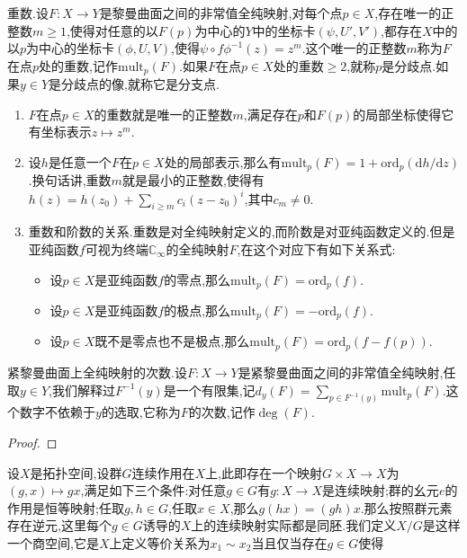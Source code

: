 重数.设$F:X\to Y$是黎曼曲面之间的非常值全纯映射,对每个点$p\in X$,存在唯一的正整数$m\ge1$,使得对任意的以$F(p)$为中心的$Y$中的坐标卡$(\psi,U',V')$,都存在$X$中的以$p$为中心的坐标卡$(\phi,U,V)$,使得$\psi\circ f\phi^{-1}(z)=z^m$.这个唯一的正整数$m$称为$F$在点$p$处的重数,记作$\mathrm{mult}_p(F)$.如果$F$在点$p\in X$处的重数$\ge2$,就称$p$是分歧点.如果$y\in Y$是分歧点的像,就称它是分支点.
\begin{enumerate}
	\item $F$在点$p\in X$的重数就是唯一的正整数$m$,满足存在$p$和$F(p)$的局部坐标使得它有坐标表示$z\mapsto z^m$.
	\item 设$h$是任意一个$F$在$p\in X$处的局部表示,那么有$\mathrm{mult}_p(F)=1+\mathrm{ord}_p(\mathrm{d}h/\mathrm{d}z)$.换句话讲,重数$m$就是最小的正整数,使得有$h(z)=h(z_0)+\sum_{i\ge m}c_i(z-z_0)^i$,其中$c_m\not=0$.
	\item 重数和阶数的关系.重数是对全纯映射定义的,而阶数是对亚纯函数定义的.但是亚纯函数$f$可视为终端$\mathbb{C}_{\infty}$的全纯映射$F$,在这个对应下有如下关系式:
	\begin{itemize}
		\item 设$p\in X$是亚纯函数$f$的零点,那么$\mathrm{mult}_p(F)=\mathrm{ord}_p(f)$.
		\item 设$p\in X$是亚纯函数$f$的极点,那么$\mathrm{mult}_p(F)=-\mathrm{ord}_p(f)$.
		\item 设$p\in X$既不是零点也不是极点,那么$\mathrm{mult}_p(F)=\mathrm{ord}_p(f-f(p))$.
	\end{itemize}
\end{enumerate}

紧黎曼曲面上全纯映射的次数.设$F:X\to Y$是紧黎曼曲面之间的非常值全纯映射,任取$y\in Y$,我们解释过$F^{-1}(y)$是一个有限集,记$d_y(F)=\sum_{p\in F^{-1}(y)}\mathrm{mult}_p(F)$.这个数字不依赖于$y$的选取,它称为$F$的次数,记作$\deg(F)$.
\begin{proof}
	
	
	
	
\end{proof}











设$X$是拓扑空间,设群$G$连续作用在$X$上,此即存在一个映射$G\times X\to X$为$(g,x)\mapsto gx$,满足如下三个条件:对任意$g\in G$有$g:X\to X$是连续映射;群的幺元$e$的作用是恒等映射;任取$g,h\in G$,任取$x\in X$,那么$g(hx)=(gh)x$.那么按照群元素存在逆元,这里每个$g\in G$诱导的$X$上的连续映射实际都是同胚.我们定义$X/G$是这样一个商空间,它是$X$上定义等价关系为$x_1\sim x_2$当且仅当存在$g\in G$使得


